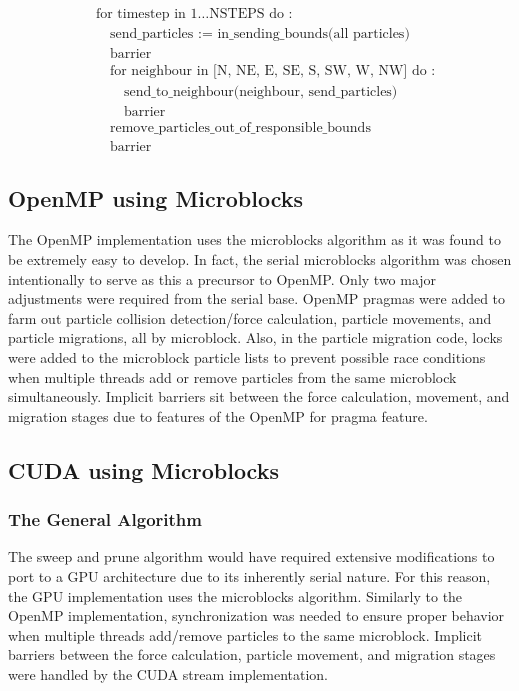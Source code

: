 \documentclass[11pt]{article} %
\begin{document}
\[
\begin{aligned} & \text{for timestep in }1\ldots\text{NSTEPS do :}\\
 & \quad\text{send\_particles := in\_sending\_bounds(all particles)}\\
 & \quad\text{barrier}\\
 & \quad\text{for neighbour in [N, NE, E, SE, S, SW, W, NW] do :}\\
 & \quad\quad\text{send\_to\_neighbour(neighbour, send\_particles)}\\
 & \quad\quad\text{barrier}\\
 & \quad\text{remove\_particles\_out\_of\_responsible\_bounds}\\
 & \quad\text{barrier}
\end{aligned}
\]

\subsection{OpenMP using Microblocks}

The OpenMP implementation uses the microblocks algorithm as it was found to be extremely easy to develop. In fact, the serial microblocks algorithm was chosen intentionally to serve as this a precursor to OpenMP. Only two major adjustments were required from the serial base. OpenMP pragmas were added to farm out particle collision detection/force calculation, particle movements, and particle migrations, all by microblock. Also, in the particle migration code, locks were added to the microblock particle lists to prevent possible race conditions when multiple threads add or remove particles from the same microblock simultaneously. Implicit barriers sit between the force calculation, movement, and migration stages due to features of the OpenMP for pragma feature.

\subsection{CUDA using Microblocks}

\subsubsection{The General Algorithm}

The sweep and prune algorithm would have required extensive modifications to port to a GPU architecture due to its inherently serial nature. For this reason, the GPU implementation uses the microblocks algorithm. Similarly to the OpenMP implementation, synchronization was needed to ensure proper behavior when multiple threads add/remove particles to the same microblock. Implicit barriers between the force calculation, particle movement, and migration stages were handled by the CUDA stream implementation.
\end{document}
